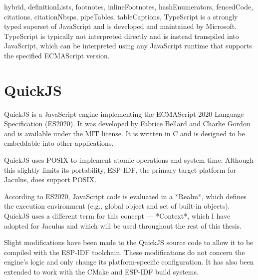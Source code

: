 \begin{markdown*}{%
  hybrid,
  definitionLists,
  footnotes,
  inlineFootnotes,
  hashEnumerators,
  fencedCode,
  citations,
  citationNbsps,
  pipeTables,
  tableCaptions,
}
TypeScript is a strongly typed superset of JavaScript and is developed and maintained by Microsoft. TypeScript is typically not interpreted directly and is instead transpiled into JavaScript, which can be interpreted using any JavaScript runtime that supports the specified ECMAScript version.

\section{QuickJS}

QuickJS is a JavaScript engine implementing the ECMAScript 2020 Language Specification\cite{es2020} (ES2020). It was developed by Fabrice Bellard and Charlie Gordon and is available under the MIT license. It is written in C and is designed to be embeddable into other applications.

QuickJS uses POSIX to implement atomic operations and system time. Although this slightly limits its portability, ESP-IDF, the primary target platform for Jaculus, does support POSIX.

According to ES2020, JavaScript code is evaluated in a *Realm*, which defines the execution environment (e.g., global object and set of built-in objects). QuickJS uses a different term for this concept --- *Context*, which I have adopted for Jaculus and which will be used throughout the rest of this thesis.

Slight modifications have been made to the QuickJS source code to allow it to be compiled with the ESP-IDF toolchain. These modifications do not concern the engine's logic and only change its platform-specific configuration. It has also been extended to work with the CMake and ESP-IDF build systems.


\end{markdown*}

